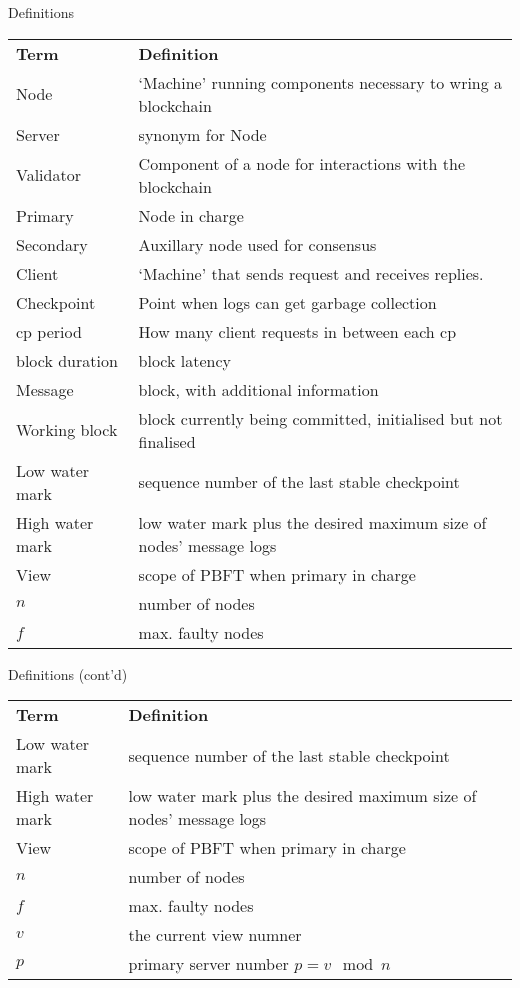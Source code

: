 \documentclass[pdf,table]{beamer}
\begin{document}
\begin{frame}{Definitions}
	\begin{table}
		\begin{tabular}{p{25mm}p{85mm}}
			{\bf Term } & {\bf Definition}\\
			Node & `Machine' running components necessary to wring a blockchain \\ 
			Server & synonym for Node\\
			Validator & Component of  a node for interactions with the blockchain \\
			Primary & Node in charge \\
			Secondary & Auxillary node used for consensus \\
			Client & `Machine' that sends request and receives replies. \\
			Checkpoint & Point when logs can get garbage collection \\ 
			cp period & How many client requests in between each cp \\
			block duration & block latency \\
			Message & block, with additional information \\
			Working block & block currently being committed, initialised but not finalised \\
			Low water mark & sequence number of the last stable checkpoint\\
			High water mark & low water mark plus the desired maximum size of nodes' message logs\\
			View & scope of PBFT when primary in charge \\
			$n$ & number of nodes \\
			$f$ & max. faulty nodes \\
		\end{tabular}
	\end{table}
\end{frame}

\begin{frame}{Definitions (cont'd)}
	\begin{table}
		\begin{tabular}{p{25mm}p{85mm}}
			{\bf Term } & {\bf Definition}\\
			Low water mark & sequence number of the last stable checkpoint\\
			High water mark & low water mark plus the desired maximum size of nodes' message logs\\
			View & scope of PBFT when primary in charge \\
			$n$ & number of nodes \\
			$f$ & max. faulty nodes \\
			$v$ & the current view numner \\
			$p$ & primary server number $p=v \mod n$\\
		\end{tabular}
	\end{table}
\end{frame}
\end{document}

